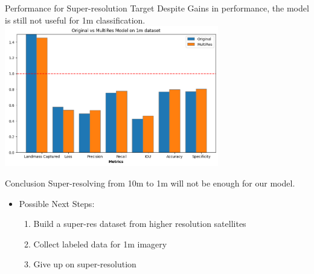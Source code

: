\begin{frame}{Performance for Super-resolution Target}
    Despite Gains in performance, the model is still not useful for 1m classification.
\centering
    \includegraphics[height=0.7\textheight,width=0.7\textwidth,keepaspectratio]{images/1m_metrics.png}
\end{frame}

\begin{frame}{Conclusion}
    Super-resolving from 10m to 1m will not be enough for our model.

    \begin{itemize}
        \item Possible Next Steps:
        \begin{enumerate}
            \item Build a super-res dataset from higher resolution satellites
            \item Collect labeled data for 1m imagery
            \item Give up on super-resolution
        \end{enumerate}
    \end{itemize}
\end{frame}